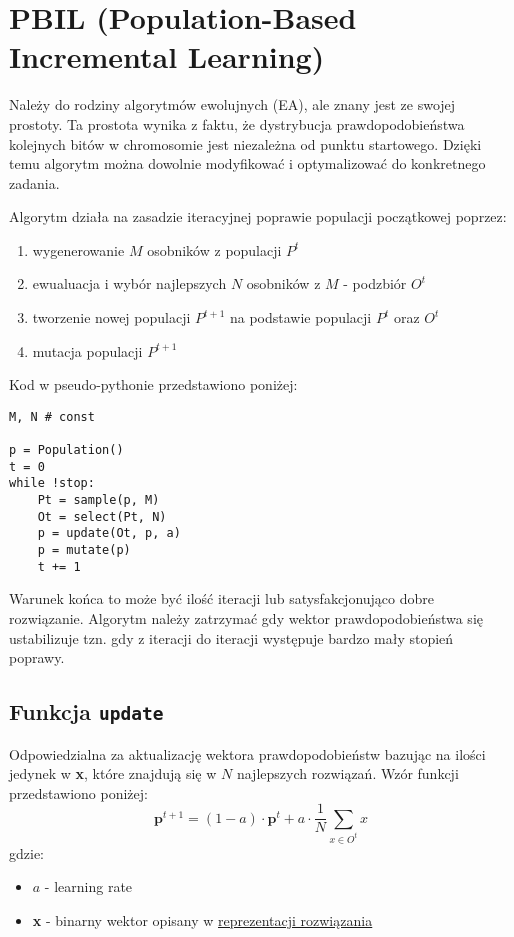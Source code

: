 \documentclass[11pt]{article}
\begin{document}
\section{PBIL (Population-Based Incremental Learning)}
\label{sec:orgf10ee1e}
Należy do rodziny algorytmów ewolujnych (EA), ale znany jest ze swojej prostoty. Ta prostota wynika z faktu, że dystrybucja prawdopodobieństwa kolejnych bitów w chromosomie jest niezależna od punktu startowego. Dzięki temu algorytm można dowolnie modyfikować i optymalizować do konkretnego zadania.

Algorytm działa na zasadzie iteracyjnej poprawie populacji początkowej poprzez:
\begin{enumerate}
\item wygenerowanie \(M\) osobników z populacji \(P^t\)
\item ewualuacja i wybór najlepszych \(N\) osobników z \(M\) - podzbiór \(O^t\)
\item tworzenie nowej populacji \(P^{t+1}\) na podstawie populacji \(P^t\) oraz \(O^t\)
\item mutacja populacji \(P^{t+1}\)
\end{enumerate}
Kod w pseudo-pythonie przedstawiono poniżej:
\begin{verbatim}
M, N # const

p = Population()
t = 0
while !stop:
    Pt = sample(p, M)
    Ot = select(Pt, N)
    p = update(Ot, p, a)
    p = mutate(p)
    t += 1
\end{verbatim}

Warunek końca to może być ilość iteracji lub satysfakcjonująco dobre rozwiązanie. Algorytm należy zatrzymać gdy wektor prawdopodobieństwa się ustabilizuje tzn. gdy z iteracji do iteracji występuje bardzo mały stopień poprawy.
\subsection{Funkcja \texttt{update}}
\label{sec:org2b8ec42}
Odpowiedzialna za aktualizację wektora prawdopodobieństw bazując na ilości jedynek w \textbf{x}, które znajdują się w \(N\) najlepszych rozwiązań. Wzór funkcji przedstawiono poniżej:
$$
        \boldsymbol{p}^{t+1}=(1-a) \cdot \boldsymbol{p}^t + a \cdot \frac{1}{N} \sum_{x \in O^t}x
$$
gdzie:
\begin{itemize}
\item \(a\) - learning rate
\item \textbf{x} - binarny wektor opisany w \hyperref[sec:orgd3d7332]{\uline{reprezentacji rozwiązania}}
\end{itemize}
\end{document}
